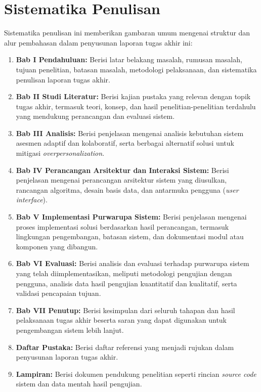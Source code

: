 \section{Sistematika Penulisan}
\label{sec:sistematika_penulisan}
Sistematika penulisan ini memberikan gambaran umum mengenai struktur dan alur pembahasan dalam penyusunan laporan tugas akhir ini:
\begin{enumerate}
\item	\textbf{Bab I Pendahuluan:} Berisi latar belakang masalah, rumusan masalah, tujuan penelitian, batasan masalah, metodologi pelaksanaan, dan sistematika penulisan laporan tugas akhir.
\item	\textbf{Bab II Studi Literatur:} Berisi kajian pustaka yang relevan dengan topik tugas akhir, termasuk teori, konsep, dan hasil penelitian-penelitian terdahulu yang mendukung perancangan dan evaluasi sistem.
\item	\textbf{Bab III Analisis:} Berisi penjelasan mengenai analisis kebutuhan sistem asesmen adaptif dan kolaboratif, serta berbagai alternatif solusi untuk mitigasi \textit{overpersonalization}.
\item   \textbf{Bab IV Perancangan Arsitektur dan Interaksi Sistem:} Berisi penjelasan mengenai perancangan arsitektur sistem yang diusulkan, rancangan algoritma, desain basis data, dan antarmuka pengguna (\textit{user interface}).
\item	\textbf{Bab V Implementasi Purwarupa Sistem:} Berisi penjelasan mengenai proses implementasi solusi berdasarkan hasil perancangan, termasuk lingkungan pengembangan, batasan sistem, dan dokumentasi modul atau komponen yang dibangun.
\item	\textbf{Bab VI Evaluasi:} Berisi analisis dan evaluasi terhadap purwarupa sistem yang telah diimplementasikan, meliputi metodologi pengujian dengan pengguna, analisis data hasil pengujian kuantitatif dan kualitatif, serta validasi pencapaian tujuan.                  
\item   \textbf{Bab VII Penutup:} Berisi kesimpulan dari seluruh tahapan dan hasil pelaksanaan tugas akhir beserta saran yang dapat digunakan untuk pengembangan sistem lebih lanjut.
\item   \textbf{Daftar Pustaka:} Berisi daftar referensi yang menjadi rujukan dalam penyusunan laporan tugas akhir.
\item   \textbf{Lampiran:} Berisi dokumen pendukung penelitian seperti rincian \textit{source code} sistem dan data mentah hasil pengujian. 
\end{enumerate}
